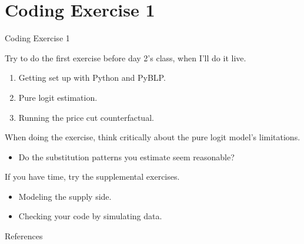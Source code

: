 \documentclass[aspectratio=169,t,11pt,table]{beamer}
\begin{document}
\section{Coding Exercise 1}

\begin{frame}{Coding Exercise 1}
    \begin{wideitemize}
        \item Try to do the first exercise before day 2's class, when I'll do it live.
        \begin{enumerate}
            \item Getting set up with Python and PyBLP.
            \item Pure logit estimation.
            \item Running the price cut counterfactual.
        \end{enumerate}
        \pause
        \item When doing the exercise, think critically about the pure logit model's limitations.
        \begin{itemize}
            \item Do the substitution patterns you estimate seem reasonable?
        \end{itemize}
        \pause
        \item If you have time, try the supplemental exercises.
        \begin{itemize}
            \item Modeling the supply side.
            \item Checking your code by simulating data.
        \end{itemize}
    \end{wideitemize}
\end{frame}

\backupbegin

\begin{frame}{References}
    
\end{frame}

\backupend
\end{document}
